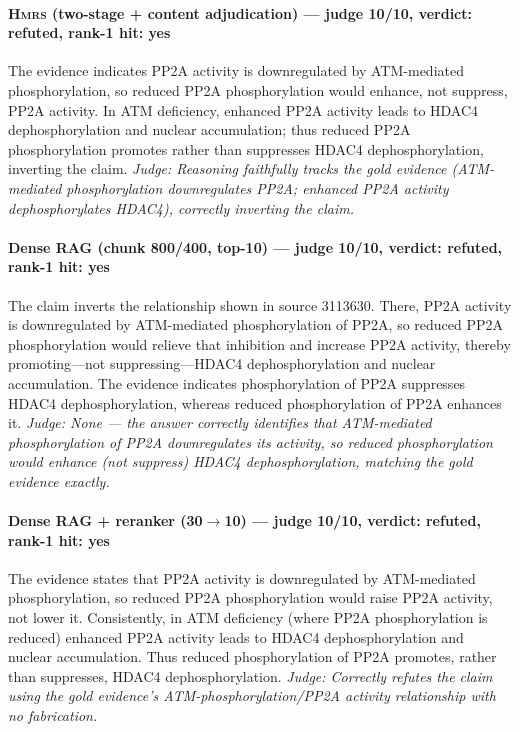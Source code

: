 \documentclass[sigconf, review, anonymous]{acmart}
\begin{document}
\paragraph{\textbf{\textsc{Hmrs}} (two-stage + content adjudication) --- judge 10/10, verdict: refuted, rank-1 hit: yes}
\noindent The evidence indicates PP2A activity is downregulated by ATM-mediated phosphorylation, so reduced PP2A phosphorylation would enhance, not suppress, PP2A activity. In ATM deficiency, enhanced PP2A activity leads to HDAC4 dephosphorylation and nuclear accumulation; thus reduced PP2A phosphorylation promotes rather than suppresses HDAC4 dephosphorylation, inverting the claim.
\noindent\small\textit{Judge: Reasoning faithfully tracks the gold evidence (ATM-mediated phosphorylation downregulates PP2A; enhanced PP2A activity dephosphorylates HDAC4), correctly inverting the claim.}
\paragraph{Dense RAG (chunk 800/400, top-10) --- judge 10/10, verdict: refuted, rank-1 hit: yes}
\noindent The claim inverts the relationship shown in source 3113630. There, PP2A activity is downregulated by ATM-mediated phosphorylation of PP2A, so reduced PP2A phosphorylation would relieve that inhibition and increase PP2A activity, thereby promoting---not suppressing---HDAC4 dephosphorylation and nuclear accumulation. The evidence indicates phosphorylation of PP2A suppresses HDAC4 dephosphorylation, whereas reduced phosphorylation of PP2A enhances it.
\noindent\small\textit{Judge: None --- the answer correctly identifies that ATM-mediated phosphorylation of PP2A downregulates its activity, so reduced phosphorylation would enhance (not suppress) HDAC4 dephosphorylation, matching the gold evidence exactly.}
\paragraph{Dense RAG + reranker (30$\to$10) --- judge 10/10, verdict: refuted, rank-1 hit: yes}
\noindent The evidence states that PP2A activity is downregulated by ATM-mediated phosphorylation, so reduced PP2A phosphorylation would raise PP2A activity, not lower it. Consistently, in ATM deficiency (where PP2A phosphorylation is reduced) enhanced PP2A activity leads to HDAC4 dephosphorylation and nuclear accumulation. Thus reduced phosphorylation of PP2A promotes, rather than suppresses, HDAC4 dephosphorylation.
\noindent\small\textit{Judge: Correctly refutes the claim using the gold evidence's ATM-phosphorylation/PP2A activity relationship with no fabrication.}
\end{document}
